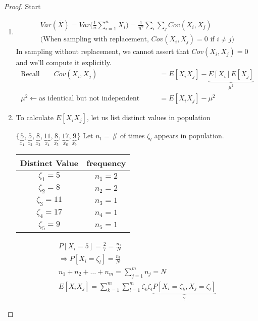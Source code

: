 \begin{proof}Start\\
\begin{enumerate}[label=\protect\circled{\arabic*}]
	\item
	\begin{gather*}
		Var(\bar{X}) = Var\bigg(\frac{1}{n} \sum\limits_{i=1}^n X_i \bigg) = \frac{1}{n^2} \sum_i \sum_j Cov(X_i, X_j)\\
		\bigg( \text{When sampling with replacement, } Cov(X_i, X_j) = 0 \text{ if } i \neq j \bigg)
	\end{gather*}
	In sampling without replacement, we cannot assert that $Cov(X_i, X_j) = 0$ and we'll compute it explicitly. 
	\begin{align*}
		\text{Recall} \qquad Cov(X_i, X_j) & = E[X_i X_j] - \underbrace{E[X_i] E[X_j]}_{\mu^2}\\
		\mu^2 \leftarrow \text{as identical but not independent} \qquad & = E[X_i X_j] - \mu^2
	\end{align*}
	\item To calculate $E[X_i X_j]$, let us list distinct values in population
	\begin{example}
	$\{\underbrace{5}_{x_1}, \underbrace{5}_{x_2}, \underbrace{8}_{x_3}, \underbrace{11}_{x_4}, \underbrace{8}_{x_5}, \underbrace{17}_{x_6}, \underbrace{9}_{x_7}\}$ Let $n_l$ = $\#$ of times $\zeta_l$ appears in population.
	\begin{center}
		\begin{tabular}{c|c}
		Distinct Value & frequency\\
		\hline
		$\zeta_1 = 5$ & $n_1=2$\\
		$\zeta_2 = 8$ & $n_2=2$\\
		$\zeta_3 = 11$ & $n_3=1$\\
		$\zeta_4 = 17$ & $n_4=1$\\
		$\zeta_5 = 9$ & $n_5=1$\\
	\end{tabular}
	\end{center}
	\end{example}
	\begin{gather*}
		P[X_i = 5] = \frac{2}{7} = \frac{n_1}{N} \tag{i draws identical}\\
		\Rightarrow P[X_i = \zeta_l] = \frac{n_l}{N}\\
		n_1 + n_2 + \ldots + n_m = \sum_{j=1}^m n_j = N\\
		E[X_i X_j] = \sum_{k=1}^m \sum_{l=1}^m \zeta_k \zeta_l \underbrace{P[X_i = \zeta_k, X_j = \zeta_l]}_{\text{?}}

\end{gather*}
\end{enumerate}
\end{proof}

